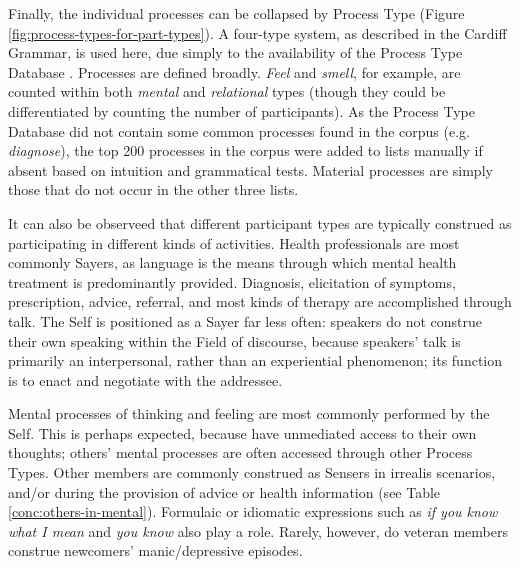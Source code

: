 Finally, the individual processes can be collapsed by Process Type (Figure \ref{fig:process-types-for-part-types}). A four-type system, as described in the Cardiff Grammar, is used here, due simply to the availability of the Process Type Database \cite{neale_more_2002}. Processes are defined broadly. \emph{Feel} and \emph{smell}, for example, are counted within both \emph{mental} and \emph{relational} types (though they could be differentiated by counting the number of participants). As the Process Type Database did not contain some common processes found in the \gls{corpus} (e.g. \emph{diagnose}), the top 200 processes in the \gls{corpus} were added to lists manually if absent based on intuition and grammatical tests. Material processes are simply those that do not occur in the other three lists.

It can also be observeed that different participant types are typically construed as participating in different kinds of activities. Health professionals are most commonly Sayers, as language is the means through which mental health treatment is predominantly provided. Diagnosis, elicitation of symptoms, prescription, advice, referral, and most kinds of therapy are accomplished through talk. The Self is positioned as a Sayer far less often: speakers do not construe their own speaking within the Field of discourse, because speakers' talk is primarily an interpersonal, rather than an experiential phenomenon; its function is to enact and negotiate with the addressee.

Mental processes of thinking and feeling are most commonly performed by the Self. This is perhaps expected, because  have unmediated access to their own thoughts; others' mental processes are often accessed through other Process Types. Other members are commonly construed as Sensers in irrealis scenarios, and\slash or during the provision of advice or health information (see Table \ref{conc:others-in-mental}). Formulaic or idiomatic expressions such as \emph{if you know what I mean} and \emph{you know} also play a role. Rarely, however, do veteran \glspl{member} construe newcomers' manic\slash depressive episodes.

